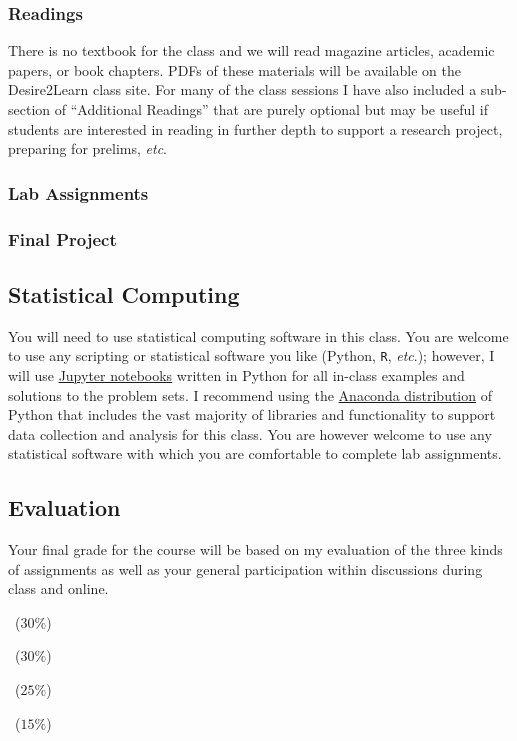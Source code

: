\documentclass[11pt]{memoir}
\begin{document}
\subsubsection{Readings}
There is no textbook for the class and we will read magazine articles, academic papers, or book chapters. PDFs of these materials will be available on the \mbox{Desire2Learn} class site. For many of the class sessions I have also included a sub-section of ``Additional Readings'' that are purely optional but may be useful if students are interested in reading in further depth to support a research project, preparing for prelims, \textit{etc}.

\subsubsection{Lab Assignments}

\subsubsection{Final Project}

\subsection{Statistical Computing}
You will need to use statistical computing software in this class. You are welcome to use any scripting or statistical software you like (Python, \texttt{R}, \textit{etc}.); however, I will use \href{http://jupyter.org/}{Jupyter notebooks} written in Python for all in-class examples and solutions to the problem sets. I recommend using the \href{https://www.continuum.io/why-anaconda}{Anaconda distribution} of Python that includes the vast majority of libraries and functionality to support data collection and analysis for this class. You are however welcome to use any statistical software with which you are comfortable to complete lab assignments.

\subsection{Evaluation} 
Your final grade for the course will be based on my evaluation of the three kinds of assignments as well as your general participation within discussions during class and online.

    \begin{description}[itemsep=0pt,labelsep=0pt]
        \item[Reading responses]~($30\%$)
        \item[Lab assignments]~($30\%$)
        \item[Final project]~($25\%$)
        \item[Participation]~($15\%$)
    \end{description}
\end{document}
